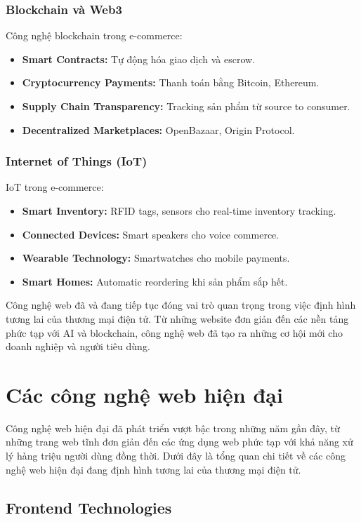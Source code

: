 \documentclass[a4paper,12pt]{report}
\begin{document}
\subsubsection{Blockchain và Web3}
Công nghệ blockchain trong e-commerce:
\begin{itemize}
    \item \textbf{Smart Contracts:} Tự động hóa giao dịch và escrow.
    \item \textbf{Cryptocurrency Payments:} Thanh toán bằng Bitcoin, Ethereum.
    \item \textbf{Supply Chain Transparency:} Tracking sản phẩm từ source to consumer.
    \item \textbf{Decentralized Marketplaces:} OpenBazaar, Origin Protocol.
\end{itemize}

\subsubsection{Internet of Things (IoT)}
IoT trong e-commerce:
\begin{itemize}
    \item \textbf{Smart Inventory:} RFID tags, sensors cho real-time inventory tracking.
    \item \textbf{Connected Devices:} Smart speakers cho voice commerce.
    \item \textbf{Wearable Technology:} Smartwatches cho mobile payments.
    \item \textbf{Smart Homes:} Automatic reordering khi sản phẩm sắp hết.
\end{itemize}

Công nghệ web đã và đang tiếp tục đóng vai trò quan trọng trong việc định hình tương lai của thương mại điện tử. Từ những website đơn giản đến các nền tảng phức tạp với AI và blockchain, công nghệ web đã tạo ra những cơ hội mới cho doanh nghiệp và người tiêu dùng.

\section{Các công nghệ web hiện đại}

Công nghệ web hiện đại đã phát triển vượt bậc trong những năm gần đây, từ những trang web tĩnh đơn giản đến các ứng dụng web phức tạp với khả năng xử lý hàng triệu người dùng đồng thời. Dưới đây là tổng quan chi tiết về các công nghệ web hiện đại đang định hình tương lai của thương mại điện tử.

\subsection{Frontend Technologies}
\end{document}
